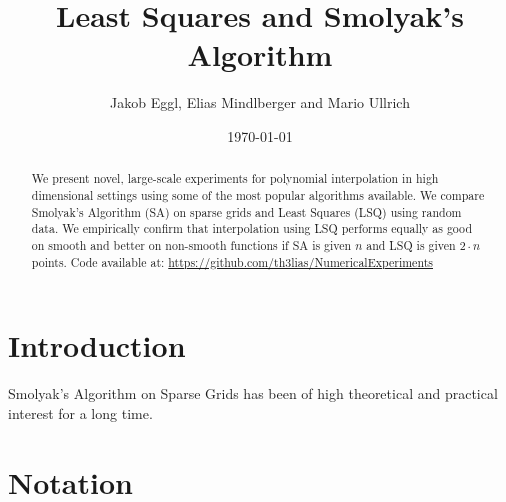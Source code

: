 \documentclass[12pt, oneside]{amsart}
\theoremstyle{definition}
\theoremstyle{remark}
\numberwithin{equation}{section}
\begin{document}
\title{Least Squares and Smolyak's Algorithm} %


\author{Jakob Eggl, Elias Mindlberger and Mario Ullrich}
\date{\today}


%
%



\begin{abstract}
We present novel, large-scale experiments for polynomial interpolation in high 
dimensional settings using some of the most popular algorithms available. We 
compare Smolyak's Algorithm (SA) on sparse grids and Least Squares (LSQ) using 
random data. We empirically confirm that interpolation using LSQ performs 
equally as good on smooth and better on non-smooth functions if SA is given 
\(n\) and LSQ is given \(2 \cdot n\) points.\newline
Code available at: 
\url{https://github.com/th3lias/NumericalExperiments}
\end{abstract}

\maketitle


\section{Introduction}
Smolyak's Algorithm on Sparse Grids has been of high theoretical and practical 
interest for a long time. %


\section{Notation}
\end{document}
